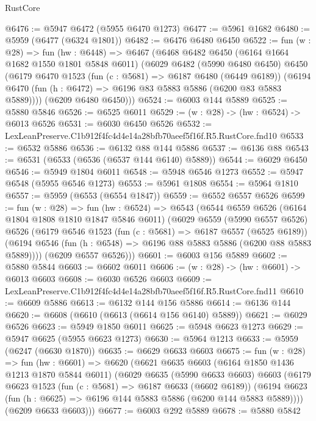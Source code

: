 \begin{lexlean}{RustCore}
\begin{coremodule}
@6476 := @5947 @6472 (@5955 @6470 @1273)
@6477 := @5961 @1682
@6480 := @5959 (@6477 (@6324 @1801))
@6482 := @6476 @6480 @6450
@6522 := fun (w : @28) =>
  fun (hw : @6448) =>
  @6467
    (@6468
      @6482
      @6450
      (@6164 @1664 @1682 @1550 @1801 @5848 @6011)
      (@6029
        @6482
        (@5990 @6480 @6450)
        @6450
        (@6179
          @6470
          @1523
          (fun (c : @5681) => @6187 @6480 (@6449 @6189))
          (@6194 @6470 (fun (h : @6472) => @6196 @83 @5883 @5886 (@6200 @83 @5883 @5889))))
        (@6209 @6480 @6450)))
@6524 := @6003 @144 @5889
@6525 := @5880 @5846
@6526 := @6525 @6011
@6529 := (w : @28) -> (hw : @6524) -> @6013 @6526
@6531 := @6030 @6450 @6526
@6532 := LexLeanPreserve.C1b912f4fc4d4e14a28bfb70aeef5f16f.R5.RustCore.fnd10
@6533 := @6532 @5886
@6536 := @6132 @88 @144 @5886
@6537 := @6136 @88
@6543 := @6531 (@6533 (@6536 (@6537 @144 @6140) @5889))
@6544 := @6029 @6450
@6546 := @5949 @1804 @6011
@6548 := @5948 @6546 @1273
@6552 := @5947 @6548 (@5955 @6546 @1273)
@6553 := @5961 @1808
@6554 := @5964 @1810
@6557 := @5959 (@6553 (@6554 @1847))
@6559 := @6552 @6557 @6526
@6599 := fun (w : @28) =>
  fun (hw : @6524) =>
  @6543
    (@6544
      @6559
      @6526
      (@6164 @1804 @1808 @1810 @1847 @5846 @6011)
      (@6029
        @6559
        (@5990 @6557 @6526)
        @6526
        (@6179
          @6546
          @1523
          (fun (c : @5681) => @6187 @6557 (@6525 @6189))
          (@6194 @6546 (fun (h : @6548) => @6196 @88 @5883 @5886 (@6200 @88 @5883 @5889))))
        (@6209 @6557 @6526)))
@6601 := @6003 @156 @5889
@6602 := @5880 @5844
@6603 := @6602 @6011
@6606 := (w : @28) -> (hw : @6601) -> @6013 @6603
@6608 := @6030 @6526 @6603
@6609 := LexLeanPreserve.C1b912f4fc4d4e14a28bfb70aeef5f16f.R5.RustCore.fnd11
@6610 := @6609 @5886
@6613 := @6132 @144 @156 @5886
@6614 := @6136 @144
@6620 := @6608 (@6610 (@6613 (@6614 @156 @6140) @5889))
@6621 := @6029 @6526
@6623 := @5949 @1850 @6011
@6625 := @5948 @6623 @1273
@6629 := @5947 @6625 (@5955 @6623 @1273)
@6630 := @5964 @1213
@6633 := @5959 (@6247 (@6630 @1870))
@6635 := @6629 @6633 @6603
@6675 := fun (w : @28) =>
  fun (hw : @6601) =>
  @6620
    (@6621
      @6635
      @6603
      (@6164 @1850 @1436 @1213 @1870 @5844 @6011)
      (@6029
        @6635
        (@5990 @6633 @6603)
        @6603
        (@6179
          @6623
          @1523
          (fun (c : @5681) => @6187 @6633 (@6602 @6189))
          (@6194 @6623 (fun (h : @6625) => @6196 @144 @5883 @5886 (@6200 @144 @5883 @5889))))
        (@6209 @6633 @6603)))
@6677 := @6003 @292 @5889
@6678 := @5880 @5842

\end{coremodule}
\end{lexlean}
